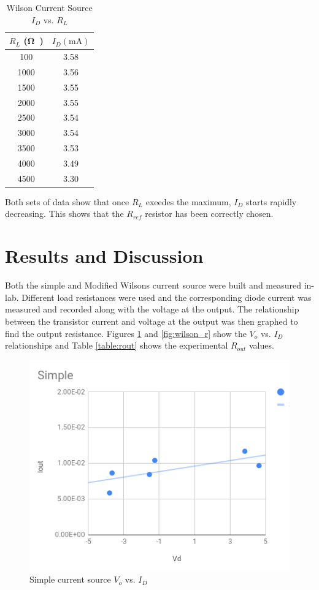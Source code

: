 \documentclass[11pt]{article}
\begin{document}
	\begin{table}[H]
		\centering
		\caption{Wilson Current Source $I_D$ vs. $R_L$}
		\label{table:wilson_pspice}
		\begin{tabular}{|c|c|}
			\hline
			$R_L$ (\si\ohm) & $I_D (\si{\milli\ampere})$\\
			\hline
			100 & 3.58\\
			1000 & 3.56\\
			1500 & 3.55\\
			2000 & 3.55\\
			2500 & 3.54\\
			3000 & 3.54\\
			3500 & 3.53\\
			4000 & 3.49\\
			4500 & 3.30\\
			\hline
		\end{tabular}
	\end{table}

	Both sets of data show that once $R_L$ exeedes the maximum, $I_D$ starts
	rapidly decreasing. This shows that the $R_{ref}$ resistor has been
	correctly chosen.


	\section{Results and Discussion}

	Both the simple and Modified Wilsons current source were built and measured
	in-lab. Different load resistances were used and the corresponding diode
	current was measured and recorded along with the voltage at the output.
	The relationship between the transistor current and voltage at the output
	was then graphed to find the output resistance. Figures \ref{fig:simple_r}
	and \ref{fig:wilson_r} show the $V_o$ vs. $I_D$ relationships and Table
	\ref{table:rout} shows the experimental $R_{out}$ values.

	\begin{figure}[H]
		\centering
		\includegraphics[width=4.0 in]{simple_rout.png}
		\caption{Simple current source $V_o$ vs. $I_D$}
		\label{fig:simple_r}
	\end{figure}
\end{document}
